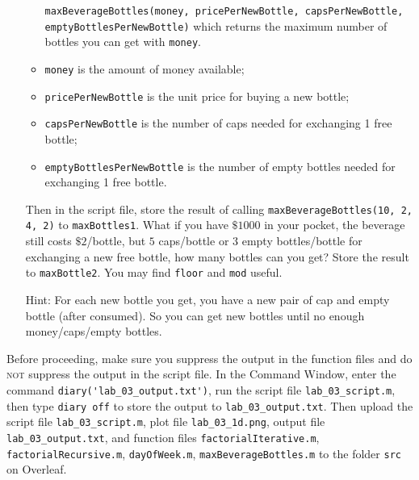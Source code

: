 \begin{enumerate}[(a)]
\begin{itemize}
        \verb|maxBeverageBottles(money, pricePerNewBottle, capsPerNewBottle, emptyBottlesPerNewBottle)|
        which returns the maximum number of bottles you can get with \verb|money|.
      \item \verb|money| is the amount of money available;
      \item \verb|pricePerNewBottle| is the unit price for buying a new bottle;
      \item \verb|capsPerNewBottle| is the number of caps needed for exchanging 1 free bottle;
      \item \verb|emptyBottlesPerNewBottle| is the number of empty bottles needed for exchanging 1 free bottle.
    \end{itemize}
    Then in the script file, store the result of calling \verb|maxBeverageBottles(10, 2, 4, 2)| to \verb|maxBottles1|. What if you have $\$1000$ in your pocket, the beverage still costs $\$2$/bottle, but $5$ caps/bottle or $3$ empty bottles/bottle for exchanging a new free bottle, how many bottles can you get? Store the result to \verb|maxBottle2|. You may find \verb|floor| and \verb|mod| useful.

    Hint: For each new bottle you get, you have a new pair of cap and empty bottle (after consumed). So you can get new bottles until no enough money/caps/empty bottles.
\end{enumerate}

Before proceeding, make sure you suppress the output in the function files and do \textsc{not} suppress the output in the script file. In the Command Window, enter the command \verb`diary('lab_03_output.txt')`, run the script file \verb|lab_03_script.m|, then type \verb`diary off` to store the output to \verb`lab_03_output.txt`. Then upload the script file \verb|lab_03_script.m|, plot file \verb|lab_03_1d.png|, output file \verb|lab_03_output.txt|, and function files \verb|factorialIterative.m|, \verb|factorialRecursive.m|, \verb|dayOfWeek.m|, \verb|maxBeverageBottles.m| to the folder \verb|src| on Overleaf.

